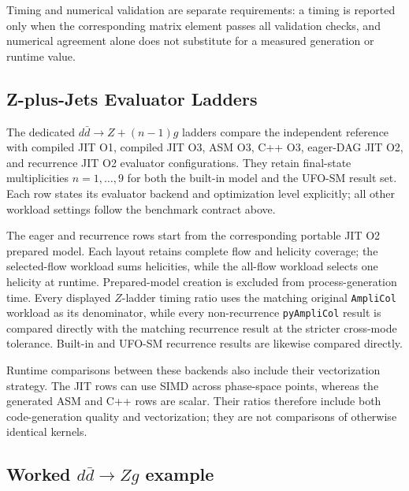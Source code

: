 \documentclass[10pt,letterpaper]{article}
\newif\ifReportLandscapePage
\newcommand{\PAC}{\texttt{pyAmpliCol}}
\newcommand{\AC}{\texttt{AmpliCol}}
\begin{document}
Timing and numerical validation are separate requirements: a timing is
reported only when the corresponding matrix element passes all validation
checks, and numerical agreement alone does not substitute for a measured
generation or runtime value.

\clearpage
\begin{landscape}
\ReportLandscapePagetrue
\pagestyle{empty}

\end{landscape}
\ReportLandscapePagefalse
\clearpage
\pagestyle{empty}
\begin{landscape}
\ReportLandscapePagetrue
\section{Z-plus-Jets Evaluator Ladders}

The dedicated $d\bar d\to Z+(n-1)g$ ladders compare the independent reference
with compiled JIT O1, compiled JIT O3, ASM O3, C++ O3, eager-DAG JIT O2, and
recurrence JIT O2 evaluator configurations. They retain
final-state multiplicities $n=1,\ldots,9$ for both the built-in model and
the UFO-SM result set. Each row states its evaluator backend
and optimization level explicitly; all other workload settings follow the
benchmark contract above.

The eager and recurrence rows start from the corresponding portable JIT O2
prepared model. Each layout retains complete flow and helicity coverage; the
selected-flow workload sums helicities, while the all-flow workload selects one
helicity at runtime. Prepared-model creation is excluded from
process-generation time. Every displayed \(Z\)-ladder timing ratio uses the
matching original \AC{} workload as its denominator, while every
non-recurrence \PAC{} result is compared directly with the matching recurrence
result at the stricter cross-mode tolerance. Built-in and UFO-SM recurrence
results are likewise compared directly.

Runtime comparisons between these backends also include their vectorization
strategy. The JIT rows can use SIMD across phase-space points, whereas the
generated ASM and C++ rows are scalar. Their ratios therefore include both
code-generation quality and vectorization; they are not comparisons of
otherwise identical kernels.

\subsection*{Worked \(d\bar d\to Zg\) example}


\end{landscape}
\end{document}
